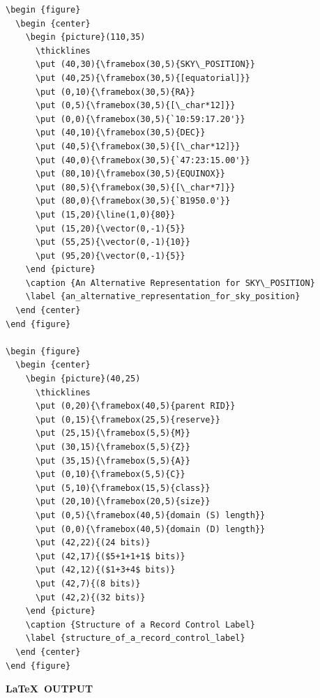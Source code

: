 \documentclass[twoside,11pt]{article}
\renewcommand{\_}{\texttt{\symbol{95}}}
\begin{document}
\newpage 

\small
\begin{verbatim}
\begin {figure}
  \begin {center}
    \begin {picture}(110,35)
      \thicklines
      \put (40,30){\framebox(30,5){SKY\_POSITION}}
      \put (40,25){\framebox(30,5){[equatorial]}}
      \put (0,10){\framebox(30,5){RA}}
      \put (0,5){\framebox(30,5){[\_char*12]}}
      \put (0,0){\framebox(30,5){`10:59:17.20'}}
      \put (40,10){\framebox(30,5){DEC}}
      \put (40,5){\framebox(30,5){[\_char*12]}}
      \put (40,0){\framebox(30,5){`47:23:15.00'}}
      \put (80,10){\framebox(30,5){EQUINOX}}
      \put (80,5){\framebox(30,5){[\_char*7]}}
      \put (80,0){\framebox(30,5){`B1950.0'}}
      \put (15,20){\line(1,0){80}}
      \put (15,20){\vector(0,-1){5}}
      \put (55,25){\vector(0,-1){10}}
      \put (95,20){\vector(0,-1){5}}
    \end {picture}
    \caption {An Alternative Representation for SKY\_POSITION}
    \label {an_alternative_representation_for_sky_position}
  \end {center}
\end {figure}

\begin {figure}
  \begin {center}
    \begin {picture}(40,25)
      \thicklines
      \put (0,20){\framebox(40,5){parent RID}}
      \put (0,15){\framebox(25,5){reserve}}
      \put (25,15){\framebox(5,5){M}}
      \put (30,15){\framebox(5,5){Z}}
      \put (35,15){\framebox(5,5){A}}
      \put (0,10){\framebox(5,5){C}}
      \put (5,10){\framebox(15,5){class}}
      \put (20,10){\framebox(20,5){size}}
      \put (0,5){\framebox(40,5){domain (S) length}}
      \put (0,0){\framebox(40,5){domain (D) length}}
      \put (42,22){(24 bits)}
      \put (42,17){($5+1+1+1$ bits)}
      \put (42,12){($1+3+4$ bits)}
      \put (42,7){(8 bits)}
      \put (42,2){(32 bits)}
    \end {picture}
    \caption {Structure of a Record Control Label}
    \label {structure_of_a_record_control_label}
  \end {center}
\end {figure}
\end{verbatim}
\normalsize

\newpage

\begin{center}
  \textbf{\LaTeX\ OUTPUT}
\end{center}
\end{document}
